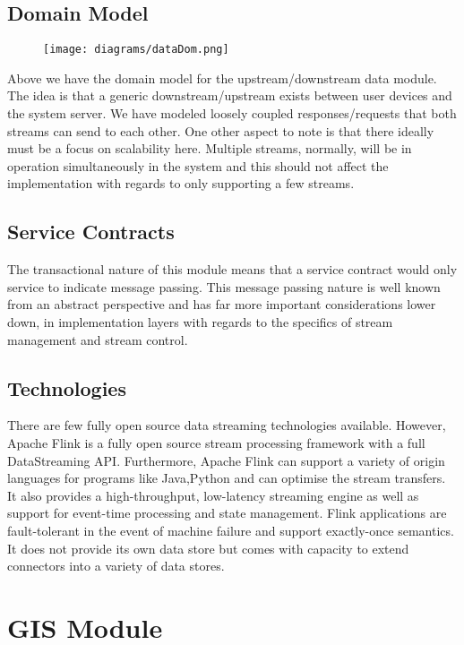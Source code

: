 \documentclass[12pt]{article}
\begin{document}
\subsection{Domain Model}
\begin{figure}[h]
\centering
\texttt{[image: diagrams/dataDom.png]}

\end{figure}
Above we have the domain model for the upstream/downstream data module. The idea is that a generic downstream/upstream exists between user devices and the system server. We have modeled loosely coupled responses/requests that both streams can send to each other. One other aspect to note is that there ideally must be a focus on scalability here. Multiple streams, normally, will be in operation simultaneously in the system and this should not affect the implementation with regards to only supporting a few streams.

\subsection{Service Contracts}
The transactional nature of this module means that a service contract would only service to indicate message passing. This message passing nature is well known from an abstract perspective and has far more important considerations lower down, in implementation layers with regards to the specifics of stream management and stream control.

\subsection{Technologies}
There are few fully open source data streaming technologies available. However, Apache Flink is a fully open source stream processing framework with a full DataStreaming API. Furthermore, Apache Flink can support a variety of origin languages for programs like Java,Python and can optimise the stream transfers. It also provides a high-throughput, low-latency streaming engine as well as support for event-time processing and state management. Flink applications are fault-tolerant in the event of machine failure and support exactly-once semantics. It does not provide its own data store but comes with capacity to extend connectors into a variety of data stores.

\section{GIS Module}
\end{document}

